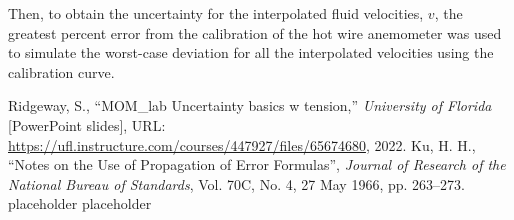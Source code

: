 \documentclass[journal,letterpaper]{IEEEtran}
\begin{document}
Then, to obtain the uncertainty for the interpolated fluid velocities, $v$, the greatest percent error from the calibration of the hot wire anemometer was used to simulate the worst-case deviation for all the interpolated velocities using the calibration curve. 

\begin{thebibliography}{99}
     Ridgeway, S., ``MOM\_lab Uncertainty basics w tension,'' \textit{University of Florida} [PowerPoint slides], URL: \url{https://ufl.instructure.com/courses/447927/files/65674680}, 2022.
     Ku, H. H., ``Notes on the Use of Propagation of Error Formulas'', \textit{Journal of Research of the National Bureau of Standards}, Vol. 70C, No. 4, 27 May 1966, pp. 263--273.
     placeholder
     placeholder
\end{thebibliography}
\end{document}
